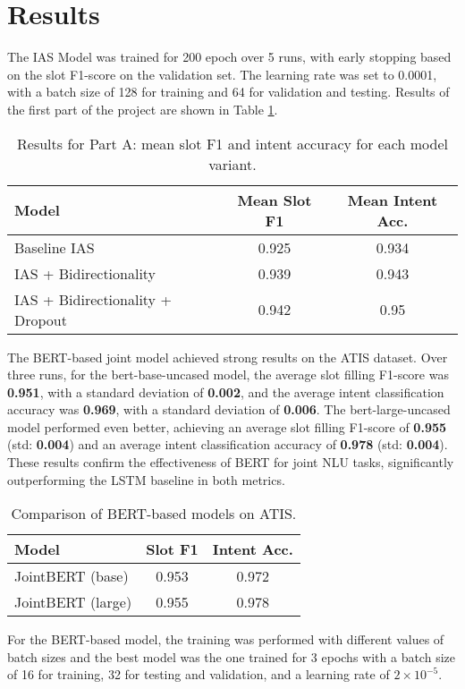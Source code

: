 \documentclass[a4paper]{article}
\begin{document}
\section{Results}
The IAS Model was trained for 200 epoch over 5 runs, with early stopping based on the slot F1-score on the validation set.
The learning rate was set to 0.0001, with a batch size of 128 for training and 64 for validation and testing. 
Results of the first part of the project are shown in Table \ref{tab:partAresults}.
\begin{table}[h!]
  \centering
  \begin{tabular}{lcc}
    \toprule
    \textbf{Model} & \textbf{Mean Slot F1} & \textbf{Mean Intent Acc.} \\
    \midrule
    Baseline IAS & 0.925 & 0.934 \\
    IAS + Bidirectionality & 0.939 & 0.943 \\
    IAS + Bidirectionality + Dropout & 0.942 & 0.95 \\ 
    \bottomrule
  \end{tabular}
  \caption{Results for Part A: mean slot F1 and intent accuracy for each model variant.}
  \label{tab:partAresults}
\end{table}

The BERT-based joint model achieved strong results on the ATIS dataset. Over three runs, for the bert-base-uncased model, the average slot filling F1-score was \textbf{ 0.951}, with a standard deviation of \textbf{0.002}, and the average intent classification accuracy
 was \textbf{0.969}, with a standard deviation of \textbf{0.006}. The bert-large-uncased model performed even better, achieving an average slot filling F1-score of \textbf{0.955} (std: \textbf{0.004}) and an average intent classification accuracy of \textbf{0.978} (std: \textbf{0.004}). 
These results confirm the effectiveness of BERT for joint NLU tasks, significantly outperforming the LSTM baseline in both metrics.

\begin{table}[h!]
  \centering
  \begin{tabular}{lcc}
    \toprule
    \textbf{Model} & \textbf{Slot F1} & \textbf{Intent Acc.} \\
    \midrule
    JointBERT (base) & 0.953 & 0.972 \\
    JointBERT (large)   & 0.955 & 0.978 \\
    \bottomrule
  \end{tabular}
  \caption{Comparison of BERT-based models on ATIS.}
  \label{tab:results}
\end{table}

For the BERT-based model, the training was performed with different values of 
batch sizes and the best model was the one trained for 3 epochs with
 a batch size of 16 for 
training, 32 for testing and validation, and a learning rate 
of $2 \times 10^{-5}$.




\end{document}
